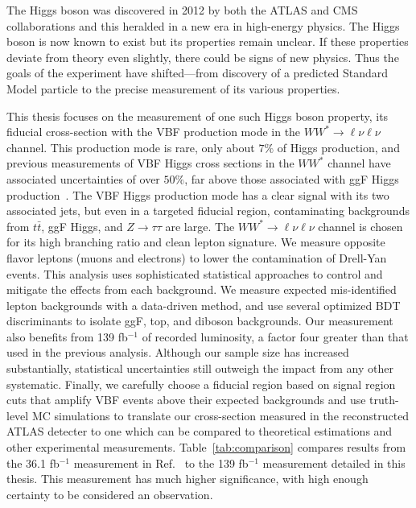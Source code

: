 The Higgs boson was discovered in 2012 by both the ATLAS and CMS collaborations and this heralded in a new era in high-energy physics. The Higgs boson is now known to exist but its properties remain unclear. If these properties deviate from theory even slightly, there could be signs of new physics. Thus the goals of the experiment have shifted---from discovery of a predicted Standard Model particle to the precise measurement of its various properties. 

This thesis focuses on the measurement of one such Higgs boson property, its fiducial cross-section with the VBF production mode in the $WW^*\rightarrow\ell\nu\ell\nu$ channel. This production mode is rare, only about $7\%$ of Higgs production, and previous measurements of VBF Higgs cross sections in the $WW^*$ channel have associated uncertainties of over $50\%$, far above those associated with ggF Higgs production~\cite{HWW2016}. The VBF Higgs production mode has a clear signal with its two associated jets, but even in a targeted fiducial region, contaminating backgrounds from $t\bar{t}$, ggF Higgs, and $Z\rightarrow\tau\tau$ are large. The $WW^*\rightarrow \ell\nu\ell\nu$ channel is chosen for its high branching ratio and clean lepton signature. We measure opposite flavor leptons (muons and electrons) to lower the contamination of Drell-Yan events. This analysis uses sophisticated statistical approaches to control and mitigate the effects from each background. We measure expected mis-identified lepton backgrounds with a data-driven method, and use several optimized BDT discriminants to isolate ggF, top, and diboson backgrounds. Our measurement also benefits from 139 fb$^{-1}$ of recorded luminosity, a factor four greater than that used in the previous analysis. Although our sample size has increased substantially, statistical uncertainties still outweigh the impact from any other systematic. Finally, we carefully choose a fiducial region based on signal region cuts that amplify VBF events above their expected backgrounds and use truth-level MC simulations to translate our cross-section measured in the reconstructed ATLAS detecter to one which can be compared to theoretical estimations and other experimental measurements. Table~\ref{tab:comparison} compares results from the 36.1 fb$^{-1}$ measurement in Ref.~\cite{HWW2016} to the 139 fb$^{-1}$ measurement detailed in this thesis. This measurement has much higher significance, with high enough certainty to be considered an observation. 

